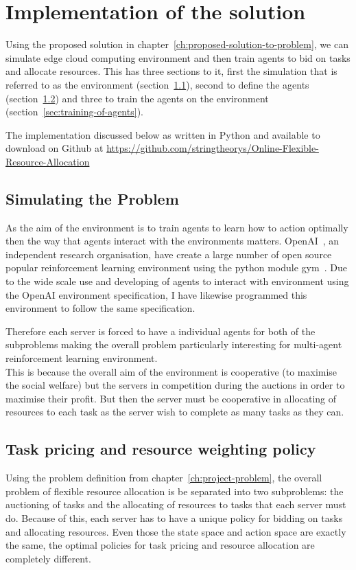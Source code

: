 \chapter{Implementation of the solution}\label{ch:implementation-of-the-solution}
Using the proposed solution in chapter~\ref{ch:proposed-solution-to-problem}, we can simulate edge cloud computing
environment and then train agents to bid on tasks and allocate resources. This has three sections to it, first the
simulation that is referred to as the environment (section~\ref{sec:simulating-the-environment}),
second to define the agents (section~\ref{sec:agent-definition}) and three to train the agents on the
environment (section~\ref{sec:training-of-agents}).

The implementation discussed below as written in Python and available to download on Github at
\url{https://github.com/stringtheorys/Online-Flexible-Resource-Allocation}

\section{Simulating the Problem}\label{sec:simulating-the-environment}
As the aim of the environment is to train agents to learn how to action optimally then the way that agents
interact with the environments matters. OpenAI~\cite{}, an independent research organisation, have create a large
number of open source popular reinforcement learning environment using the python module gym~\cite{}.
Due to the wide scale use and developing of agents to interact with environment using the OpenAI environment
specification, I have likewise programmed this environment to follow the same specification. %

Therefore each server is forced to have a individual agents for both of the subproblems making the overall problem
particularly interesting for multi-agent reinforcement learning environment. \\
This is because the overall aim of the environment is cooperative (to maximise the social welfare) but the servers
in competition during the auctions in order to maximise their profit.
But then the server must be cooperative in allocating of resources to each task as the server wish to complete as
many tasks as they can.

\section{Task pricing and resource weighting policy}\label{sec:agent-definition}
Using the problem definition from chapter~\ref{ch:project-problem}, the overall problem of flexible resource allocation
is be separated into two subproblems: the auctioning of tasks and the allocating of resources to tasks that each server
must do. Because of this, each server has to have a unique policy for bidding on tasks and allocating resources.
Even those the state space and action space are exactly the same, the optimal policies for task pricing and
resource allocation are completely different.

